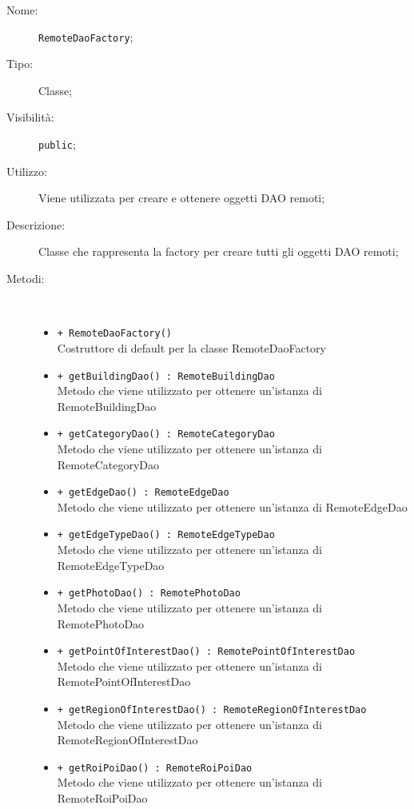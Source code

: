 \documentclass[../DefinizioneDiProdotto.tex]{subfiles}
\begin{document}
\begin{description}
	\item[Nome:] \texttt{RemoteDaoFactory};
	\item[Tipo:] Classe;
	\item[Visibilità:] \texttt{public};
	\item[Utilizzo:] Viene utilizzata per creare e ottenere oggetti DAO remoti;
	\item[Descrizione:] Classe che rappresenta la factory per creare tutti gli oggetti DAO remoti;
	\item[Metodi:] \
	\begin{itemize}
		\item \texttt{+ RemoteDaoFactory()}\\
		Costruttore di default per la classe RemoteDaoFactory
		\item \texttt{+ getBuildingDao() : RemoteBuildingDao}\\
		Metodo che viene utilizzato per ottenere un'istanza di RemoteBuildingDao
		\item \texttt{+ getCategoryDao() : RemoteCategoryDao}\\
		Metodo che viene utilizzato per ottenere un'istanza di RemoteCategoryDao
		\item \texttt{+ getEdgeDao() : RemoteEdgeDao}\\
		Metodo che viene utilizzato per ottenere un'istanza di RemoteEdgeDao
		\item \texttt{+ getEdgeTypeDao() : RemoteEdgeTypeDao}\\
		Metodo che viene utilizzato per ottenere un'istanza di RemoteEdgeTypeDao
		\item \texttt{+ getPhotoDao() : RemotePhotoDao}\\
		Metodo che viene utilizzato per ottenere un'istanza di RemotePhotoDao
		\item \texttt{+ getPointOfInterestDao() : RemotePointOfInterestDao}\\
		Metodo che viene utilizzato per ottenere un'istanza di RemotePointOfInterestDao
		\item \texttt{+ getRegionOfInterestDao() : RemoteRegionOfInterestDao}\\
		Metodo che viene utilizzato per ottenere un'istanza di RemoteRegionOfInterestDao
		\item \texttt{+ getRoiPoiDao() : RemoteRoiPoiDao}\\
		Metodo che viene utilizzato per ottenere un'istanza di RemoteRoiPoiDao
	\end{itemize}
\end{description}
\end{document}
